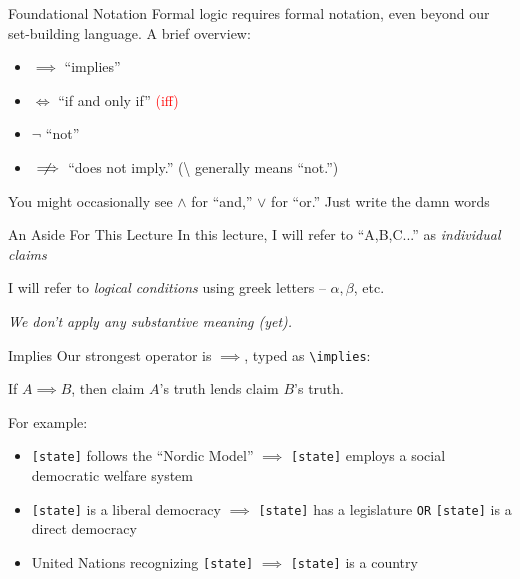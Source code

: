 \documentclass[10pt]{beamer}
\begin{document}
\begin{frame}{Foundational Notation}
    Formal logic requires formal notation, even beyond our set-building language. A brief overview:

    \begin{itemize}
        \item $\implies$ \quad ``implies''
        \item $\iff$ \quad ``if and only if'' \textcolor{red}{(iff)}
        \item $\neg$ \quad ``not''
        \item $\centernot\implies$ \quad ``does not imply.'' (\textbackslash{} generally means ``not.'')
    \end{itemize}

    You might occasionally see $\land$ for ``and,'' $\lor$ for ``or.'' Just write the damn words
\end{frame}

\begin{frame}{An Aside For This Lecture}
    In this lecture, I will refer to ``A,B,C...'' as \emph{individual claims}

    I will refer to \emph{logical conditions} using greek letters -- $\alpha,\beta$, etc.

    \emph{We don't apply any substantive meaning (yet).}
\end{frame}

\begin{frame}[fragile]{Implies}
Our strongest operator is $\implies$, typed as \verb|\implies|:

If $A \implies B$, then claim $A$'s truth lends claim $B$'s truth.
\pause

For example:

\begin{itemize}
    \item \verb|[state]| follows the ``Nordic Model'' $\implies$ \verb|[state]| employs a social democratic welfare system
    \item \verb|[state]| is a liberal democracy $\implies$ \verb|[state]| has a legislature \verb|OR| \verb|[state]| is a direct democracy
    \item United Nations recognizing \verb|[state]| $\implies$ \verb|[state]| is a country
\end{itemize}
\end{frame}
\end{document}
